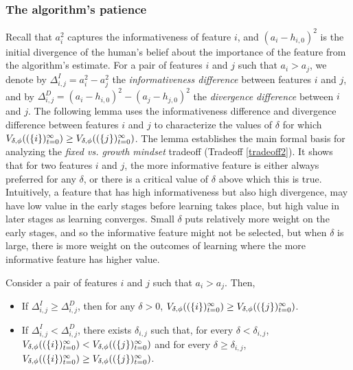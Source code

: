 \subsubsection{The algorithm's patience}
Recall that $a^2_i$ captures the informativeness of feature $i$, and $(a_i - h_{i, 0})^2$ is the initial divergence of the human's belief about the importance of the feature from the algorithm's estimate. For a pair of features $i$ and $j$ such that $a_i > a_j$, we denote by $\Delta^I_{i,j} = a^2_i - a^2_j$ the \emph{informativeness difference} between features $i$ and $j$, and by $\Delta^D_{i,j} = (a_i - h_{i,0})^2 - (a_j - h_{j,0})^2$ the \emph{divergence difference} between $i$ and $j$. The following lemma uses the informativeness difference and divergence difference between features $i$ and $j$ to characterize the values of $\delta$ for which $V_{\delta,\phi}((\{i\})_{t=0}^\infty)\geq V_{\delta,\phi}((\{j\})_{t=0}^\infty)$.
The lemma establishes the main formal basis for analyzing the  \emph{fixed vs. growth mindset} tradeoff (Tradeoff \ref{tradeoff2}). 
It shows that for two features $i$ and $j$, the more informative feature is either always preferred for any $\delta$, or there is a critical value of $\delta$ above which this is true. 
Intuitively, a feature that has high informativeness but also high divergence, may have low value in the early stages  
before learning takes place, but high value in later stages as learning converges. Small $\delta$ puts relatively more weight on the early stages, and so the informative feature might not be selected, but when $\delta$ is large, there is more weight on the outcomes of learning where the more informative feature has higher value.
\begin{lemma} \label{prop:switch-point}
Consider a pair of features $i$ and $j$ such that $a_i > a_j$. Then, 
\begin{itemize}
    \item If $\Delta^I_{i,j} \geq \Delta^D_{i,j} $, then for any $\delta>0$, $V_{\delta,\phi}((\{i\})_{t=0}^\infty) \geq V_{\delta,\phi}((\{j\})_{t=0}^\infty)$.
    \item  If $\Delta^I_{i,j} < \Delta^D_{i,j}$, there exists $\delta_{i,j}$ such that, for every $\delta<\delta_{i,j}$, $V_{\delta,\phi}((\{i\})_{t=0}^\infty) < V_{\delta,\phi}((\{j\})_{t=0}^\infty)$ and for every $\delta \geq \delta_{i,j}$, $V_{\delta,\phi}((\{i\})_{t=0}^\infty) \geq V_{\delta,\phi}((\{j\})_{t=0}^\infty)$.
    \end{itemize}
\end{lemma}
